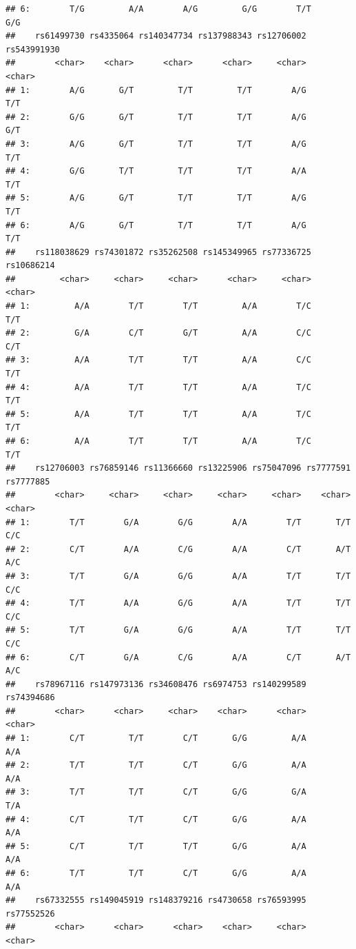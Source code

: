 \documentclass[
]{article}
\begin{document}
\begin{verbatim}
## 6:        T/G         A/A        A/G         G/G        T/T        G/G
##    rs61499730 rs4335064 rs140347734 rs137988343 rs12706002 rs543991930
##        <char>    <char>      <char>      <char>     <char>      <char>
## 1:        A/G       G/T         T/T         T/T        A/G         T/T
## 2:        G/G       G/T         T/T         T/T        A/G         G/T
## 3:        A/G       G/T         T/T         T/T        A/G         T/T
## 4:        G/G       T/T         T/T         T/T        A/A         T/T
## 5:        A/G       G/T         T/T         T/T        A/G         T/T
## 6:        A/G       G/T         T/T         T/T        A/G         T/T
##    rs118038629 rs74301872 rs35262508 rs145349965 rs77336725 rs10686214
##         <char>     <char>     <char>      <char>     <char>     <char>
## 1:         A/A        T/T        T/T         A/A        T/C        T/T
## 2:         G/A        C/T        G/T         A/A        C/C        C/T
## 3:         A/A        T/T        T/T         A/A        C/C        T/T
## 4:         A/A        T/T        T/T         A/A        T/C        T/T
## 5:         A/A        T/T        T/T         A/A        T/C        T/T
## 6:         A/A        T/T        T/T         A/A        T/C        T/T
##    rs12706003 rs76859146 rs11366660 rs13225906 rs75047096 rs7777591 rs7777885
##        <char>     <char>     <char>     <char>     <char>    <char>    <char>
## 1:        T/T        G/A        G/G        A/A        T/T       T/T       C/C
## 2:        C/T        A/A        C/G        A/A        C/T       A/T       A/C
## 3:        T/T        G/A        G/G        A/A        T/T       T/T       C/C
## 4:        T/T        A/A        G/G        A/A        T/T       T/T       C/C
## 5:        T/T        G/A        G/G        A/A        T/T       T/T       C/C
## 6:        C/T        G/A        C/G        A/A        C/T       A/T       A/C
##    rs78967116 rs147973136 rs34608476 rs6974753 rs140299589 rs74394686
##        <char>      <char>     <char>    <char>      <char>     <char>
## 1:        C/T         T/T        C/T       G/G         A/A        A/A
## 2:        T/T         T/T        C/T       G/G         A/A        A/A
## 3:        T/T         T/T        C/T       G/G         G/A        T/A
## 4:        C/T         T/T        C/T       G/G         A/A        A/A
## 5:        C/T         T/T        T/T       G/G         A/A        A/A
## 6:        T/T         T/T        C/T       G/G         A/A        A/A
##    rs67332555 rs149045919 rs148379216 rs4730658 rs76593995 rs77552526
##        <char>      <char>      <char>    <char>     <char>     <char>

\end{verbatim}
\end{document}

